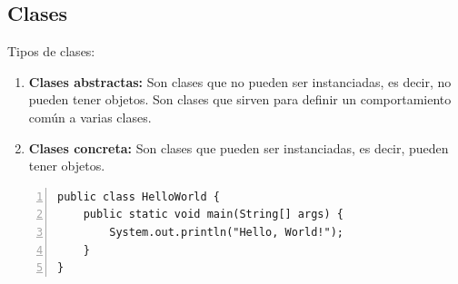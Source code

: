 \documentclass[../main.tex]{subfiles}
\begin{document}
    \subsection{Clases}
        Tipos de clases:
        \begin{enumerate}
            \item \textbf{Clases abstractas:} Son clases que no pueden ser instanciadas, es decir, no pueden tener objetos. Son clases que sirven para definir un comportamiento común a varias clases.
            \item \textbf{Clases concreta:} Son clases que pueden ser instanciadas, es decir, pueden tener objetos.
        \end{enumerate}


        \begin{lstlisting}[style=Java, frame=single, caption=Clase abstracta, numbers=left]
public class HelloWorld {
    public static void main(String[] args) {
        System.out.println("Hello, World!");
    }
}
        \end{lstlisting}
\end{document}
